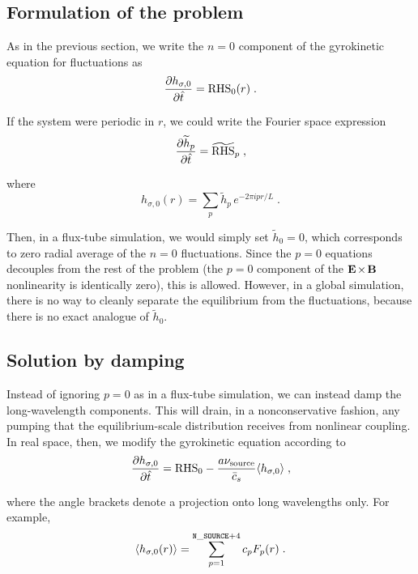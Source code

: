 \subsection{Formulation of the problem}

\noindent
As in the previous section, we write the $n=0$ component 
of the gyrokinetic equation for fluctuations as
%
\begin{equation}
\frac{\partial h_{\sigma,0}}{\partial \hat{t}} = \mbox{RHS}_0(r) \; .
\end{equation}

\noindent
If the system were periodic in $r$, we could write the Fourier 
space expression
%
\begin{equation}
\frac{\partial \widetilde{h}_p}{\partial\hat{t}} = \widetilde{\mbox{RHS}}_p \; ,
\end{equation}

\noindent
where 
%
\begin{equation}
h_{\sigma,0}(r) = \sum_p \widetilde{h}_p \, e^{- 2 \pi i p r/L} \; .
\end{equation}

\noindent
Then, in a flux-tube simulation, we would simply set 
$\widetilde{h}_0=0$, which corresponds to zero radial 
average of the $n=0$ fluctuations.  Since the $p=0$ 
equations decouples from the rest of the problem (the 
$p=0$ component of the ${\bf E}\hskip -1pt \times \hskip -1pt {\bf B}$ nonlinearity is identically 
zero), this is allowed.  However, in a global simulation, 
there is no way to cleanly separate the equilibrium from the 
fluctuations, because there is no exact analogue of 
$\widetilde{h}_0$.

\subsection{Solution by damping}

Instead of ignoring $p=0$ as in a flux-tube simulation, 
we can instead damp the long-wavelength components. This 
will drain, in a nonconservative fashion, any pumping that 
the equilibrium-scale distribution receives from nonlinear 
coupling. In real space, then, we modify the gyrokinetic 
equation according to
%
\begin{equation}
\frac{\partial h_{\sigma,0}}{\partial\hat{t}} 
 = \mbox{RHS}_0 - \frac{a \nu_{\rm source}}{\bar{c}_s} 
 \langle h_{\sigma,0} \rangle \; ,
\end{equation}
 
\noindent
where the angle brackets denote a projection onto long wavelengths 
only.  For example, 
%
\begin{equation}
 \langle h_{\sigma,0}(r) \rangle = 
  \sum_{p=1}^{{\tt N\_SOURCE}+4} c_p F_p(r) \; .
\end{equation}

